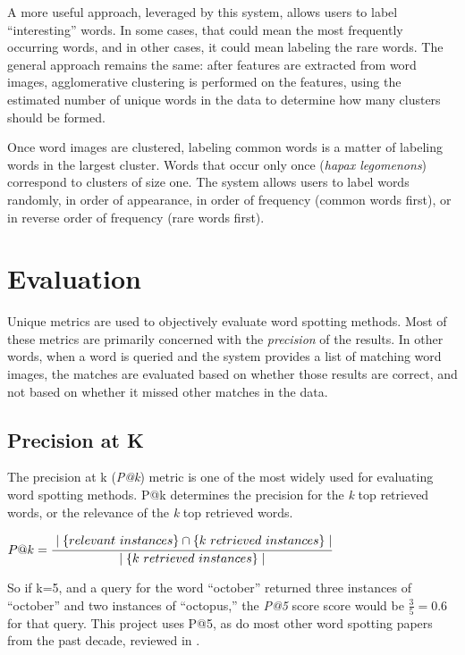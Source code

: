 \documentclass[final]{ukthesis}
\begin{document}
A more useful approach, leveraged by this system, allows users to label ``interesting'' words. In some cases, that could mean the most frequently occurring words, and in other cases, it could mean labeling the rare words. The general approach remains the same: after features are extracted from word images, agglomerative clustering is performed on the features, using the estimated number of unique words in the data to determine how many clusters should be formed.

Once word images are clustered, labeling common words is a matter of labeling words in the largest cluster. Words that occur only once ({\em hapax legomenons}) correspond to clusters of size one. The system allows users to label words randomly, in order of appearance, in order of frequency (common words first), or in reverse order of frequency (rare words first).


%
%
\section{Evaluation}
\label{sec:evaluation}
Unique metrics are used to objectively evaluate word spotting methods. Most of these metrics are primarily concerned with the {\em precision} of the results. In other words, when a word is queried and the system provides a list of matching word images, the matches are evaluated based on whether those results are correct, and not based on whether it missed other matches in the data.

\subsection{Precision at K}
The precision at k ({\em P@k}) metric is one of the most widely used for evaluating word spotting methods. P@k determines the precision for the {\em k} top retrieved words, or the relevance of the {\em k} top retrieved words.
\begin{center}
\begin{math}
{P@k}=\cfrac{\mid\{relevant\ instances\}\cap\{k\ retrieved\ instances\}\mid} {\mid \{k\ retrieved\ instances\}\mid}
\end{math}
\end{center}

So if k=5, and a query for the word ``october'' returned three instances of ``october'' and two instances of ``octopus,'' the {\em P@5} score score would be \begin{math}\frac{3}{5} = 0.6\end{math} for that query. This project uses P@5, as do most other word spotting papers from the past decade, reviewed in \cite{giotis2017survey}.
\end{document}
